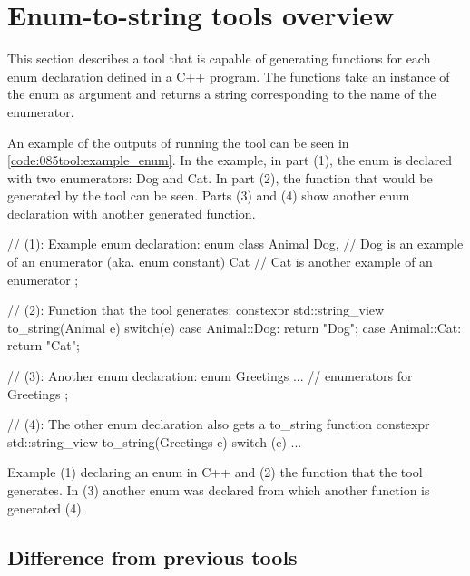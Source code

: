 \pagebreak
\section{Enum-to-string tools overview}
This section describes a tool that is capable of generating  functions for each enum declaration defined in a C++ program. The  functions take an instance of the enum as argument and returns a string corresponding to the name of the enumerator.

An example of the outputs of running the tool can be seen in \cref{code:085tool:example_enum}. In the example, in part (1), the enum  is declared with two enumerators: Dog and Cat. In part (2), the  function that would be generated by the tool can be seen. Parts (3) and (4) show another enum declaration with another generated  function.

\begin{listing}[H]
    \begin{cppcode}
// (1): Example enum declaration:
enum class Animal{
    Dog, // Dog is an example of an enumerator (aka. enum constant)
    Cat // Cat is another example of an enumerator
};

// (2): Function that the tool generates:
constexpr std::string_view to_string(Animal e){
    switch(e) {
        case Animal::Dog: return "Dog";
        case Animal::Cat: return "Cat";
    }
}

// (3): Another enum declaration:
enum Greetings {
    ... // enumerators for Greetings
};

// (4): The other enum declaration also gets a to_string function
constexpr std::string_view to_string(Greetings e){
    switch (e) {
        ... 
    }
}
    \end{cppcode}
    \caption{Example (1) declaring an enum in C++ and (2) the  function that the tool generates. In (3) another enum was declared from which another  function is generated (4).}
    \label{code:085tool:example_enum}
\end{listing}

\subsection{Difference from previous tools}

